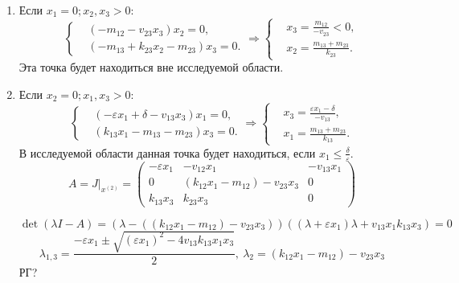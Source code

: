 \begin{enumerate}
        \item Если \( x_1 = 0; x_2, x_3 > 0 \):
            \[
                \left\{\begin{split}
                    & \left( -m_{12} - v_{23} x_3 \right) x_2 = 0, \\
                    & \left( -m_{13} + k_{23} x_2 - m_{23} \right) x_3 = 0. 
                \end{split}\right.
                \Rightarrow
                \left\{\begin{split}
                    & x_3 = \frac{ m_{12} }{ -v_{23} } < 0, \\
                    & x_2 = \frac{m_{13} + m_{23}}{k_{23}} . 
                \end{split}\right.
            \]
            Эта точка будет находиться вне исследуемой области.
        \item Если \( x_2 = 0; x_1, x_3 > 0 \):
            \[
                \left\{\begin{split}
                    & \left( -\varepsilon x_1 + \delta - v_{13} x_3 \right)x_1 = 0, \\
                    & \left( k_{13} x_1 -m_{13} - m_{23} \right)x_3 = 0. 
                \end{split}\right.
                \Rightarrow
                \left\{\begin{split}
                    & x_3 = \frac{ \varepsilon x_1 - \delta }{ -v_{13} }, \\
                    & x_1 = \frac{m_{13} + m_{23}}{k_{13}}. 
                \end{split}\right.
            \]
            В исследуемой области данная точка будет находиться, если \( x_1 \leq \frac{\delta}{\varepsilon} \).
            \[
                A = J \big|_{x^{(2)}} = \left(
                    \begin{matrix}
                        -\varepsilon x_1 & -v_{12}  x_1  & -v_{13} x_1 \\
                        0 & \left( k_{12} x_1 - m_{12} \right) - v_{23} x_3 & 0 \\
                        k_{13} x_3 & k_{23} x_3 & 0
                    \end{matrix}
                \right)
            \]
            
            \[
                \det(\lambda I - A) = \left( \lambda - \left( \left( k_{12} x_1 - m_{12} \right) - v_{23} x_3 \right) \right) \left( (\lambda + \varepsilon x_1)\lambda + v_{13} x_1 k_{13} x_3 \right) = 0
            \]
            \[
                \lambda_{1,3} = \frac{-\varepsilon x_1 \pm \sqrt{ (\varepsilon x_1)^2 - 4 v_{13} k_{13} x_1 x_3 } }{2}, ~ 
                \lambda_2 = \left( k_{12} x_1 - m_{12} \right) - v_{23} x_3
            \]
            РГ?


\end{enumerate}
